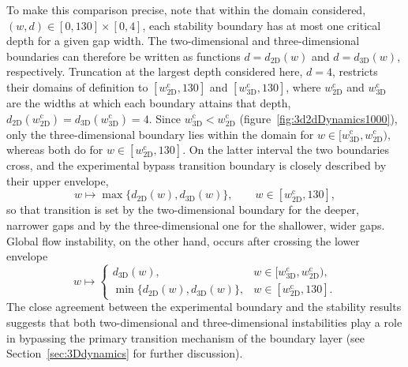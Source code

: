 \documentclass[lineno]{jfm}
\begin{document}
To make this comparison precise, note that within the domain considered, $(w,d)\in[0,130]\times[0,4]$, each stability boundary has at most one critical depth for a given gap width. The two-dimensional and three-dimensional boundaries can therefore be written as functions $d=d_\mathrm{2D}(w)$ and $d=d_\mathrm{3D}(w)$, respectively. Truncation at the largest depth considered here, $d=4$, restricts their domains of definition to $[w_\mathrm{2D}^\mathrm{c},130]$ and $[w_\mathrm{3D}^\mathrm{c},130]$, where $w_\mathrm{2D}^\mathrm{c}$ and $w_\mathrm{3D}^\mathrm{c}$ are the widths at which each boundary attains that depth, $d_\mathrm{2D}(w_\mathrm{2D}^\mathrm{c})=d_\mathrm{3D}(w_\mathrm{3D}^\mathrm{c})=4$. Since $w_\mathrm{3D}^\mathrm{c}<w_\mathrm{2D}^\mathrm{c}$ (figure~\ref{fig:3d2dDynamics1000}), only the three-dimensional boundary lies within the domain for $w\in[w_\mathrm{3D}^\mathrm{c},w_\mathrm{2D}^\mathrm{c})$, whereas both do for $w\in[w_\mathrm{2D}^\mathrm{c},130]$. On the latter interval the two boundaries cross, and the experimental bypass transition boundary is closely described by their upper envelope,
\begin{equation}
	w\longmapsto\max\{d_\mathrm{2D}(w),d_\mathrm{3D}(w)\},\qquad w\in[w_\mathrm{2D}^\mathrm{c},130],
\end{equation}
so that transition is set by the two-dimensional boundary for the deeper, narrower gaps and by the three-dimensional one for the shallower, wider gaps. Global flow instability, on the other hand, occurs after crossing the lower envelope
\begin{equation}
	w\longmapsto
	\begin{cases}
		d_\mathrm{3D}(w),                        & w\in[w_\mathrm{3D}^\mathrm{c},w_\mathrm{2D}^\mathrm{c}), \\
		\min\{d_\mathrm{2D}(w),d_\mathrm{3D}(w)\}, & w\in[w_\mathrm{2D}^\mathrm{c},130].
	\end{cases}
\end{equation}
The close agreement between the experimental boundary and the stability results suggests that both two-dimensional and three-dimensional instabilities play a role in bypassing the primary transition mechanism of the boundary layer (see Section~\ref{sec:3Ddynamics} for further discussion).
\end{document}

